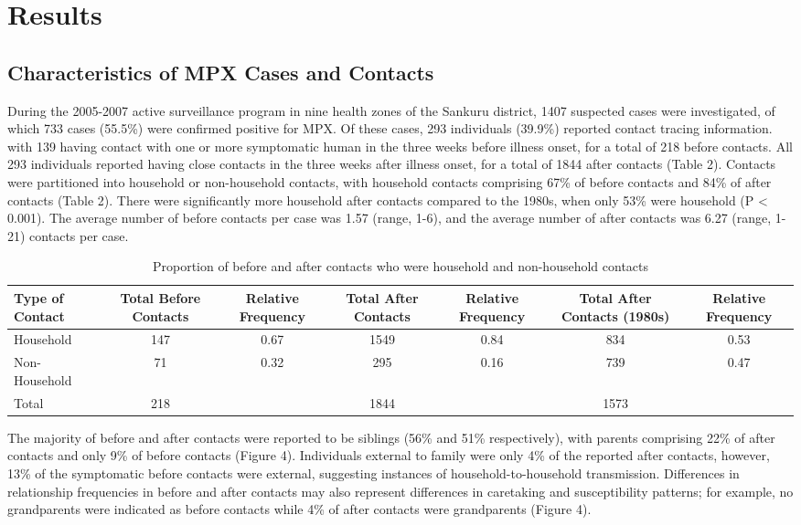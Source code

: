 \section{Results}

\subsection{Characteristics of MPX Cases and Contacts}

During the 2005-2007 active surveillance program in nine health zones of the Sankuru district, 1407 suspected cases were investigated, of which 733 cases (55.5\%) were confirmed positive for MPX. Of these cases, 293 individuals (39.9\%) reported contact tracing information. with 139 having contact with one or more symptomatic human in the three weeks before illness onset, for a total of 218 before contacts. All 293 individuals reported having close contacts in the three weeks after illness onset, for a total of 1844 after contacts (Table 2). Contacts were partitioned into household or non-household contacts, with household contacts comprising 67\% of before contacts and 84\% of after contacts (Table 2). There were significantly more household after contacts compared to the 1980s, when only 53\% were household (P < 0.001). The average number of before contacts per case was 1.57 (range, 1-6), and the average number of after contacts was 6.27 (range, 1-21) contacts per case. 


\begin{table}[!h]
\resizebox{\textwidth}{!}
\begin{tabular}{lcccccc} 
\toprule
Type of Contact & Total Before Contacts & Relative Frequency &	Total After Contacts &	Relative Frequency & Total After Contacts (1980s) & Relative Frequency \\
\midrule
Household & 147 & 0.67 & 1549 &	0.84 & 834 & 0.53 \\
Non-Household &	71 & 0.32 &	295	& 0.16 & 739 & 0.47 \\
Total &	218	& &	1844 &	& 1573 & \\
\bottomrule
\end{tabular}
\caption{Proportion of before and after contacts who were household and non-household contacts}
\label{tab:table1}
\end{table}


The majority of before and after contacts were reported to be siblings (56\% and 51\% respectively), with parents comprising 22\% of after contacts and only 9\% of before
contacts (Figure 4). Individuals external to family were only 4\% of the reported after contacts, however, 13\% of the symptomatic before contacts were external, suggesting instances of household-to-household transmission. Differences in relationship frequencies in before and after contacts may also represent differences in caretaking and susceptibility patterns; for example, no grandparents were indicated as before contacts while 4\% of after contacts were grandparents (Figure 4).
